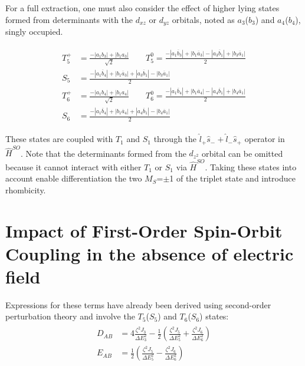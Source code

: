 \documentclass[10pt]{report}
\numberwithin{equation}{section}
\begin{document}
For a full extraction, one must also consider the effect of higher lying states formed from determinants with the $d_{xz}$ or $d_{yz}$ orbitals, noted as $a_3$($b_3$) and $a_4$($b_4$), singly occupied. 

\begin{align}\label{T5T6}
    \begin{split}
        T_5^+&=\frac{-|a_1b_3|+|b_1a_3|}{\sqrt{2}} \qquad T_5^0=\frac{-|a_1\overline{b}_3|+|b_1\overline{a}_3|-|a_3\overline{b}_1|+|b_3\overline{a}_1|}{2}\\
        S_5&=\frac{-|a_1\overline{b}_4|+|b_1\overline{a}_3|+|a_3\overline{b}_1|-|b_3\overline{a}_1|}{2}\\
        T_6^+&=\frac{-|a_1b_4|+|b_1a_4|}{\sqrt{2}} \qquad T_6^0=\frac{-|a_1\overline{b}_4|+|b_1\overline{a}_4|-|a_4\overline{b}_1|+|b_4\overline{a}_1|}{2}\\
        S_6&=\frac{-|a_1\overline{b}_4|+|b_1\overline{a}_4|+|a_4\overline{b}_1|-|b_4\overline{a}_1|}{2}
    \end{split}
\end{align}

These states are coupled with $T_1$ and $S_1$ through the $\hat{l}_+ \hat{s}_- + \hat{l}_-\hat{s}_+$ operator in $\hat{H}^{SO}$.
Note that the determinants formed from the $d_{z^2}$ orbital can be omitted because it cannot interact with either $T_1$ or $S_1$ via $\hat{H}^{SO}$.
Taking these states into account enable differentiation the two $M_S$=$\pm$1 of the triplet state and introduce rhombicity.

\section{Impact of First-Order Spin-Orbit Coupling in the absence of electric field}\label{sec:NoField}

Expressions for these terms have already been derived using second-order perturbation theory and involve the $T_5$($S_5$) and $T_6$($S_6$) states:
\begin{align}\label{eq:PertCu2Cl5}
    \begin{split}
        D_{AB}&=4\frac{\zeta^2 J_3}{\Delta E^2_3}-\frac{1}{2}(\frac{\zeta^2 J_5}{\Delta E^2_5}+\frac{\zeta^2 J_6}{\Delta E^2_6})\\
        E_{AB}&=\frac{1}{2}(\frac{\zeta^2 J_5}{\Delta E^2_5}-\frac{\zeta^2 J_6}{\Delta E^2_6})
    \end{split}
\end{align}
\end{document}
